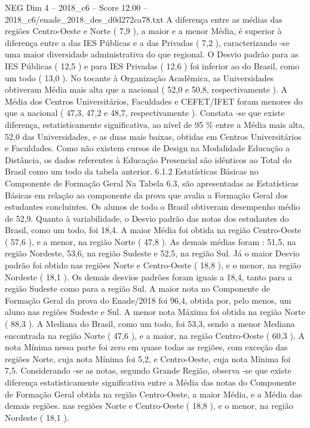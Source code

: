 \begin{textsample}{NEG Dim 4 – 2018\_c6 – Score 12.00 – 2018\_c6/enade\_2018\_des\_d0d272ca78.txt}
A diferença entre as médias das regiões Centro-Oeste e Norte ( 7,9 ), a maior e a menor Média, é superior à diferença entre a das IES Públicas e a das Privadas ( 7,2 ), caracterizando -se uma maior diversidade administrativa do que regional.
O Desvio padrão para as IES Públicas ( 12,5 ) e para IES Privadas ( 12,6 ) foi inferior ao do Brasil, como um todo ( 13,0 ).
No tocante à Organização Acadêmica, as Universidades obtiveram Média mais alta que a nacional ( 52,0 e 50,8, respectivamente ).
A Média dos Centros Universitários, Faculdades e CEFET/IFET foram menores do que a nacional ( 47,3, 47,2 e 48,7, respectivamente ).
Constata -se que existe diferença, estatisticamente significativa, ao nível de 95 \% entre a Média mais alta, 52,0 das Universidades, e as duas mais baixas, obtidas em Centros Universitários e Faculdades.
Como não existem cursos de Design na Modalidade Educação a Distância, os dados referentes à Educação Presencial são idênticos ao Total do Brasil como um todo da tabela anterior. 6.1.2 Estatísticas Básicas no Componente de Formação Geral Na Tabela 6.3, são apresentadas as Estatísticas Básicas em relação ao componente da prova que avalia a Formação Geral dos estudantes concluintes.
Os alunos de todo o Brasil obtiveram desempenho médio de 52,9.
Quanto à variabilidade, o Desvio padrão das notas dos estudantes do Brasil, como um todo, foi 18,4.
A maior Média foi obtida na região Centro-Oeste ( 57,6 ), e a menor, na região Norte ( 47,8 ).
As demais médias foram : 51,5, na região Nordeste, 53,6, na região Sudeste e 52,5, na região Sul.
Já o maior Desvio padrão foi obtido nas regiões Norte e Centro-Oeste ( 18,8 ), e o menor, na região Nordeste ( 18,1 ).
Os demais desvios padrões foram iguais a 18,4, tanto para a região Sudeste como para a região Sul.
A maior nota no Componente de Formação Geral da prova do Enade/2018 foi 96,4, obtida por, pelo menos, um aluno nas regiões Sudeste e Sul.
A menor nota Máxima foi obtida na região Norte ( 88,3 ).
A Mediana do Brasil, como um todo, foi 53,3, sendo a menor Mediana encontrada na região Norte ( 47,6 ), e a maior, na região Centro-Oeste ( 60,3 ).
A nota Mínima nessa parte foi zero em quase todas as regiões, com exceção das regiões Norte, cuja nota Mínima foi 5,2, e Centro-Oeste, cuja nota Mínima foi 7,5.
Considerando -se as notas, segundo Grande Região, observa -se que existe diferença estatisticamente significativa entre a Média das notas do Componente de Formação Geral obtida na região Centro-Oeste, a maior Média, e a Média das demais regiões. nas regiões Norte e Centro-Oeste ( 18,8 ), e o menor, na região Nordeste ( 18,1 ).

\end{textsample}
